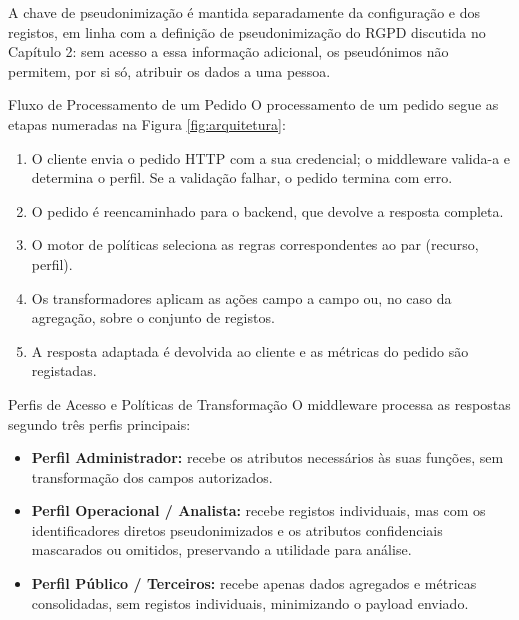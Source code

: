 \documentclass[12pt,reqno, twoside]{amsbook}
\makeatletter
\def\section{\@startsection{section}{1}%
      \z@{.5\linespacing\@plus.7\linespacing}{.25\linespacing}%
      {\normalfont\bfseries\flushleft}}
\theoremstyle{plain}
\numberwithin{equation}{chapter}
\numberwithin{table}{chapter}
\numberwithin{figure}{chapter}
\numberwithin{section}{chapter}
\makeatother
\begin{document}
\noindent A chave de pseudonimização é mantida separadamente da configuração e dos registos, em linha com a definição de pseudonimização do RGPD discutida no Capítulo 2: sem acesso a essa informação adicional, os pseudónimos não permitem, por si só, atribuir os dados a uma pessoa.

\section{Fluxo de Processamento de um Pedido}
\noindent O processamento de um pedido segue as etapas numeradas na Figura \ref{fig:arquitetura}:
\begin{enumerate}[leftmargin=*]
    \item O cliente envia o pedido HTTP com a sua credencial; o middleware valida-a e determina o perfil. Se a validação falhar, o pedido termina com erro.
    \item O pedido é reencaminhado para o backend, que devolve a resposta completa.
    \item O motor de políticas seleciona as regras correspondentes ao par (recurso, perfil).
    \item Os transformadores aplicam as ações campo a campo ou, no caso da agregação, sobre o conjunto de registos.
    \item A resposta adaptada é devolvida ao cliente e as métricas do pedido são registadas.
\end{enumerate}

\section{Perfis de Acesso e Políticas de Transformação}
\noindent O middleware processa as respostas segundo três perfis principais:
\begin{itemize}[leftmargin=*]
    \item \textbf{Perfil Administrador:} recebe os atributos necessários às suas funções, sem transformação dos campos autorizados.
    \item \textbf{Perfil Operacional / Analista:} recebe registos individuais, mas com os identificadores diretos pseudonimizados e os atributos confidenciais mascarados ou omitidos, preservando a utilidade para análise.
    \item \textbf{Perfil Público / Terceiros:} recebe apenas dados agregados e métricas consolidadas, sem registos individuais, minimizando o payload enviado.
\end{itemize}
\end{document}
